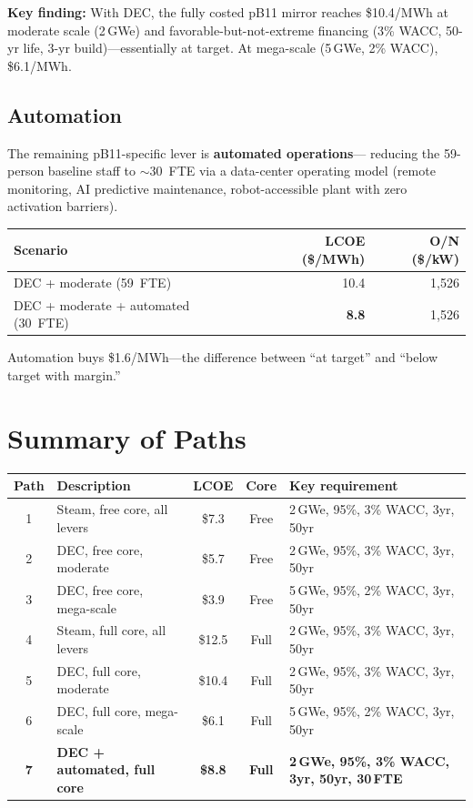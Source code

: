 \documentclass[11pt,a4paper]{article}
\begin{document}
\textbf{Key finding:} With DEC, the fully costed pB11 mirror reaches
\$10.4/MWh at moderate scale (2\,GWe) and favorable-but-not-extreme
financing (3\% WACC, 50-yr life, 3-yr build)---essentially at target.
At mega-scale (5\,GWe, 2\% WACC), \$6.1/MWh.

\subsection{Automation}

The remaining pB11-specific lever is \textbf{automated operations}---
reducing the 59-person baseline staff to $\sim$30~FTE via a
data-center operating model (remote monitoring, AI predictive
maintenance, robot-accessible plant with zero activation barriers).

\begin{center}
\begin{tabular}{lrr}
\toprule
Scenario & LCOE (\$/MWh) & O/N (\$/kW) \\
\midrule
DEC + moderate (59~FTE) & 10.4 & 1{,}526 \\
DEC + moderate + automated (30~FTE) & \textbf{8.8} & 1{,}526 \\
\bottomrule
\end{tabular}
\end{center}

Automation buys \$1.6/MWh---the difference between ``at target'' and
``below target with margin.''


\section{Summary of Paths}

\begin{center}
\begin{tabular}{clccp{5.5cm}}
\toprule
Path & Description & LCOE & Core & Key requirement \\
\midrule
1 & Steam, free core, all levers & \$7.3 & Free &
  2\,GWe, 95\%, 3\% WACC, 3yr, 50yr \\
2 & DEC, free core, moderate & \$5.7 & Free &
  2\,GWe, 95\%, 3\% WACC, 3yr, 50yr \\
3 & DEC, free core, mega-scale & \$3.9 & Free &
  5\,GWe, 95\%, 2\% WACC, 3yr, 50yr \\
\midrule
4 & Steam, full core, all levers & \$12.5 & Full &
  2\,GWe, 95\%, 3\% WACC, 3yr, 50yr \\
5 & DEC, full core, moderate & \$10.4 & Full &
  2\,GWe, 95\%, 3\% WACC, 3yr, 50yr \\
6 & DEC, full core, mega-scale & \$6.1 & Full &
  5\,GWe, 95\%, 2\% WACC, 3yr, 50yr \\
\textbf{7} & \textbf{DEC + automated, full core} & \textbf{\$8.8} & \textbf{Full} &
  \textbf{2\,GWe, 95\%, 3\% WACC, 3yr, 50yr, 30\,FTE} \\
\bottomrule
\end{tabular}
\end{center}
\end{document}
